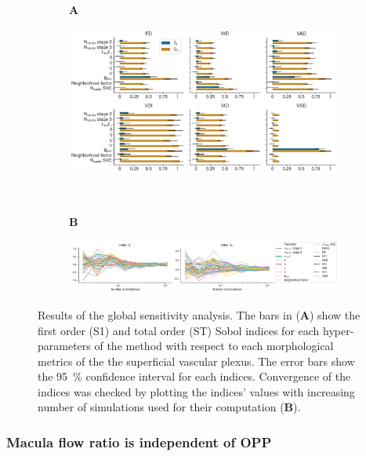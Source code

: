 \documentclass[11pt,]{article}
\begin{document}
\begin{figure}[ht!]
  \centering
  \begin{subfigure}[t]{.03\textwidth}
    \textbf{A}
  \end{subfigure}
  \begin{subfigure}[t]{.95\textwidth}
    \includegraphics[width=\textwidth, valign=t]{SobolIndices}
  \end{subfigure}
  \\
  \begin{subfigure}[t]{.03\textwidth}
    \textbf{B}
  \end{subfigure}
  \begin{subfigure}[t]{.95\textwidth}
    \includegraphics[width=\textwidth, valign=t]{ConvergenceSobolIndices}
  \end{subfigure}
  \caption{Results of the global sensitivity analysis. The bars in (\textbf{A}) show the first order (S1) and total order (ST) Sobol indices for each hyper-parameters of the method with respect to each morphological metrics of the the superficial vascular plexus. 
    The error bars show the \SI{95}{\%} confidence interval for each indices. Convergence of the indices was checked by plotting the indices' values with increasing number of simulations used for their computation (\textbf{B}).}
  \label{fig:gsa}
\end{figure}

\subsubsection{Macula flow ratio is independent of OPP}\label{sec:UQ}
\end{document}
